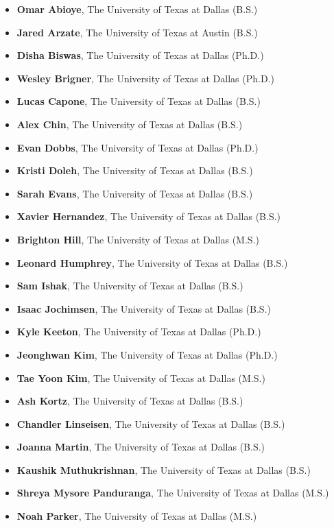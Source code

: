 \documentclass[12pt]{article}
\begin{document}
\begin{itemize}[noitemsep]
\item \textbf{Omar Abioye}, The University of Texas at Dallas (B.S.) 
\item \textbf{Jared Arzate}, The University of Texas at Austin (B.S.) 
\item \textbf{Disha Biswas}, The University of Texas at Dallas (Ph.D.) 
\item \textbf{Wesley Brigner}, The University of Texas at Dallas (Ph.D.) 
\item \textbf{Lucas Capone}, The University of Texas at Dallas (B.S.) 
\item \textbf{Alex Chin}, The University of Texas at Dallas (B.S.) 
\item \textbf{Evan Dobbs}, The University of Texas at Dallas (Ph.D.) 
\item \textbf{Kristi Doleh}, The University of Texas at Dallas (B.S.) 
\item \textbf{Sarah Evans}, The University of Texas at Dallas (B.S.) 
\item \textbf{Xavier Hernandez}, The University of Texas at Dallas (B.S.) 
\item \textbf{Brighton Hill}, The University of Texas at Dallas (M.S.) 
\item \textbf{Leonard Humphrey}, The University of Texas at Dallas (B.S.) 
\item \textbf{Sam Ishak}, The University of Texas at Dallas (B.S.) 
\item \textbf{Isaac Jochimsen}, The University of Texas at Dallas (B.S.) 
\item \textbf{Kyle Keeton}, The University of Texas at Dallas (Ph.D.) 
\item \textbf{Jeonghwan Kim}, The University of Texas at Dallas (Ph.D.) 
\item \textbf{Tae Yoon Kim}, The University of Texas at Dallas (M.S.)
\item \textbf{Ash Kortz}, The University of Texas at Dallas (B.S.) 
\item \textbf{Chandler Linseisen}, The University of Texas at Dallas (B.S.) 
\item \textbf{Joanna Martin}, The University of Texas at Dallas (B.S.) 
\item \textbf{Kaushik Muthukrishnan}, The University of Texas at Dallas (B.S.) 
\item \textbf{Shreya Mysore Panduranga}, The University of Texas at Dallas (M.S.) 
\item \textbf{Noah Parker}, The University of Texas at Dallas (M.S.) 

\end{itemize}
\end{document}
